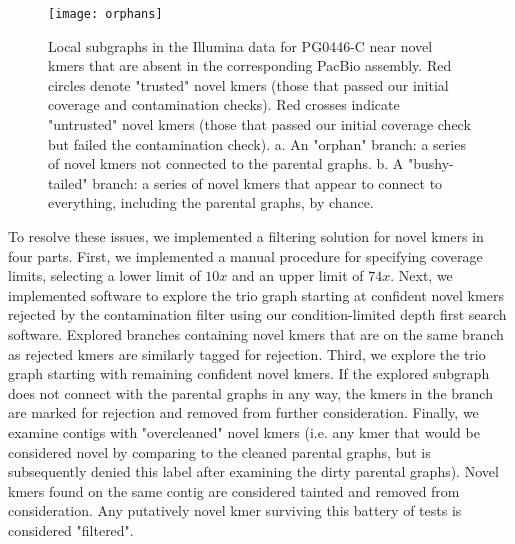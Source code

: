 \begin{figure}[h!]
  \centering
    \texttt{[image: orphans]}
  \caption{Local subgraphs in the Illumina data for PG0446-C near novel kmers that are absent in the corresponding PacBio assembly.  Red circles denote "trusted" novel kmers (those that passed our initial coverage and contamination checks).  Red crosses indicate "untrusted" novel kmers (those that passed our initial coverage check but failed the contamination check).  a. An "orphan" branch: a series of novel kmers not connected to the parental graphs.  b. A "bushy-tailed" branch: a series of novel kmers that appear to connect to everything, including the parental graphs, by chance.}
  \label{fig:orphans}
\end{figure}

To resolve these issues, we implemented a filtering solution for novel kmers in four parts.  First, we implemented a manual procedure for specifying coverage limits, selecting a lower limit of $10x$ and an upper limit of $74x$.  Next, we implemented software to explore the trio graph starting at confident novel kmers rejected by the contamination filter using our condition-limited depth first search software.  Explored branches containing novel kmers that are on the same branch as rejected kmers are similarly tagged for rejection.  Third, we explore the trio graph starting with remaining confident novel kmers.  If the explored subgraph does not connect with the parental graphs in any way, the kmers in the branch are marked for rejection and removed from further consideration.  Finally, we examine contigs with "overcleaned" novel kmers (i.e. any kmer that would be considered novel by comparing to the cleaned parental graphs, but is subsequently denied this label after examining the dirty parental graphs).  Novel kmers found on the same contig are considered tainted and removed from consideration.  Any putatively novel kmer surviving this battery of tests is considered "filtered".

